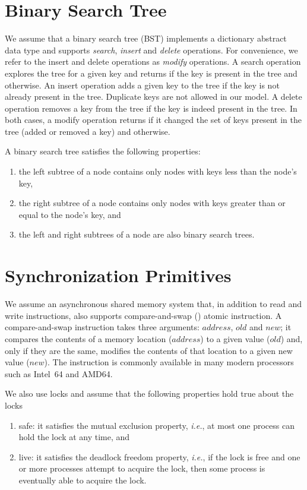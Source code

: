\section{Binary Search Tree}
We assume that a binary search tree (BST) implements a dictionary abstract data type and supports \emph{search}, \emph{insert} and \emph{delete} operations. For convenience, we refer to the insert and delete operations as \emph{modify} operations. A search operation explores the tree for a given key and returns \true{} if the key is present in the tree and \false{} otherwise. An insert operation adds a given key to the tree if the key is not already present in the tree. Duplicate keys are not allowed in our model. A delete operation removes a key from the tree if the key is indeed present in the tree. In both cases, a modify operation returns \true{} if it changed the set of keys present in the tree (added or removed a key) and \false{} otherwise.

A binary search tree satisfies the following properties:
\begin{enumerate}[label=(\alph*)]
\item the left subtree of a node contains only nodes with keys less than the node's key, 
\item the right subtree of a node contains only nodes with keys greater than or equal to the node's key, and
\item the left and right subtrees of a node are also binary search trees.
\end{enumerate}

\section{Synchronization Primitives}
We assume an asynchronous shared memory system that, in addition to read and write instructions, also supports compare-and-swap (\CAS{}) atomic instruction. A compare-and-swap  instruction takes three arguments: $address$, $old$ and $new$; it compares the contents of a memory location ($address$) to a given value ($old$) and, only if they are the same, modifies the contents of that location to a given new value ($new$). The \CAS{} instruction is commonly available in many modern processors such as Intel~64 and AMD64. 

We also use locks and assume that the following properties hold true about the locks
\begin{enumerate}[label=(\alph*)]
\item safe: it satisfies the mutual exclusion property, \emph{i.e.}, at most one process can hold the lock at any time, and 
\item live: it satisfies the deadlock freedom property, \emph{i.e.}, if the lock is free and one or more processes attempt to acquire the lock, then some process is eventually able to acquire the lock.
\end{enumerate}


